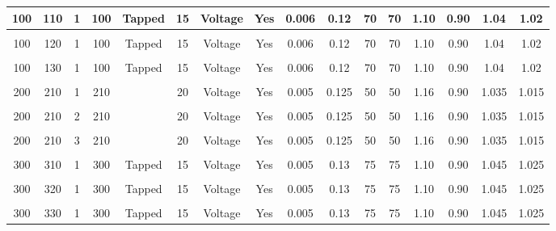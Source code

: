 \documentclass[paper=a4, fontsize=11pt]{article}
\begin{document}
\begin{landscape}
\begin{table}[b]
\begin{tabular}{|c|c|c|c|c|c|c|c|c|c|c|c|c|c|c|c|}
100       & 110       & 1         & 100       & Tapped    & 15        & Voltage   & Yes       & 0.006     & 0.12      & 70        & 70        & 1.10      & 0.90      & 1.04      & 1.02      \\ \hline &&&&&&&&&&&&&&&\\[-1em]
100       & 120       & 1         & 100       & Tapped    & 15        & Voltage   & Yes       & 0.006     & 0.12      & 70        & 70        & 1.10      & 0.90      & 1.04      & 1.02      \\ \hline &&&&&&&&&&&&&&&\\[-1em]
100       & 130       & 1         & 100       & Tapped    & 15        & Voltage   & Yes       & 0.006     & 0.12      & 70        & 70        & 1.10      & 0.90      & 1.04      & 1.02      \\ \hline &&&&&&&&&&&&&&&\\[-1em]
200       & 210       & 1         & 210       &           & 20        & Voltage   & Yes       & 0.005     & 0.125     & 50        & 50        & 1.16      & 0.90      & 1.035     & 1.015     \\ \hline &&&&&&&&&&&&&&&\\[-1em]
200       & 210       & 2         & 210       &           & 20        & Voltage   & Yes       & 0.005     & 0.125     & 50        & 50        & 1.16      & 0.90      & 1.035     & 1.015     \\ \hline &&&&&&&&&&&&&&&\\[-1em]
200       & 210       & 3         & 210       &           & 20        & Voltage   & Yes       & 0.005     & 0.125     & 50        & 50        & 1.16      & 0.90      & 1.035     & 1.015     \\ \hline &&&&&&&&&&&&&&&\\[-1em]
300       & 310       & 1         & 300       & Tapped    & 15        & Voltage   & Yes       & 0.005     & 0.13      & 75        & 75        & 1.10      & 0.90      & 1.045     & 1.025     \\ \hline &&&&&&&&&&&&&&&\\[-1em]
300       & 320       & 1         & 300       & Tapped    & 15        & Voltage   & Yes       & 0.005     & 0.13      & 75        & 75        & 1.10      & 0.90      & 1.045     & 1.025     \\ \hline &&&&&&&&&&&&&&&\\[-1em]
300       & 330       & 1         & 300       & Tapped    & 15        & Voltage   & Yes       & 0.005     & 0.13      & 75        & 75        & 1.10      & 0.90      & 1.045     & 1.025     \\ \hline
\end{tabular}
\end{table}

\end{landscape}
\end{document}
